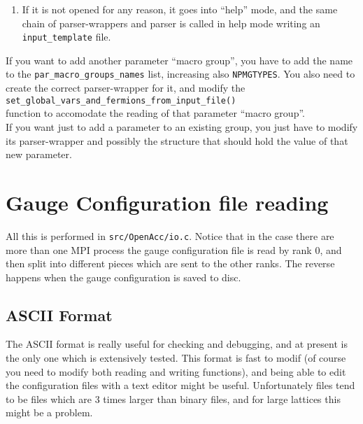 \begin{enumerate}
\begin{enumerate}
        \end{enumerate}
    \item If it is not opened for any reason, it goes into ``help'' mode, and the 
        same chain of parser-wrappers and parser is called in help mode writing an 
        \verb|input_template| file.
\end{enumerate}
If you want to add another parameter ``macro group'', you have to add the name 
to the \verb|par_macro_groups_names| list, increasing also \verb|NPMGTYPES|.
You also need to create the correct parser-wrapper for it, and modify the \\
\verb|set_global_vars_and_fermions_from_input_file()| \\function to accomodate 
the reading of that parameter ``macro group''.\\
If you want just to add a parameter to an existing group, you just have to 
modify its parser-wrapper and possibly the structure that should hold the value 
of that new parameter.

\section{Gauge Configuration file reading}
All this is performed in \verb|src/OpenAcc/io.c|.
Notice that in the case there are more than one MPI process the gauge configuration
file is read by rank 0, and then split into different pieces which are sent to the 
other ranks. The reverse happens when the gauge configuration is saved to disc.

\subsection{ASCII Format}
The ASCII format is really useful for checking and debugging, and at present is 
the only one which is extensively tested. This format is fast to modif (of 
course you need to modify both reading and writing functions), and being able 
to edit the configuration files with a text editor might be useful.
Unfortunately files tend to be files which are 3 times larger than binary 
files, and for large lattices this might be a problem.

